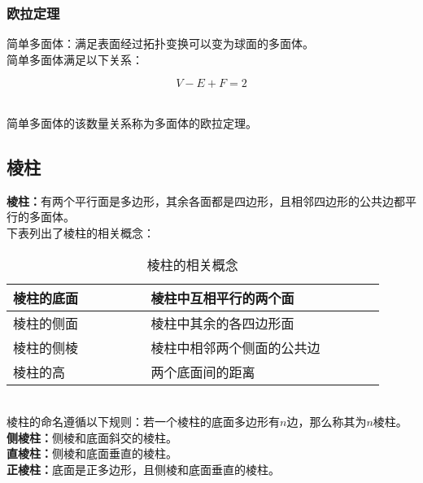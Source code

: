 \documentclass[UTF8]{ctexart}
\begin{document}
\subsubsection{欧拉定理}
    简单多面体：满足表面经过拓扑变换可以变为球面的多面体。\\[3mm]
    简单多面体满足以下关系：
    \begin{large}
        \begin{equation*}
            V-E+F=2
        \end{equation*}
    \end{large}\\
    简单多面体的该数量关系称为多面体的欧拉定理。

\newpage

\subsection{棱柱}
    \textbf{棱柱：}有两个平行面是多边形，其余各面都是四边形，且相邻四边形的公共边都平行的多面体。\\[3mm]
    下表列出了棱柱的相关概念：\vspace{5pt}
    \begin{table}[h]
        \begin{center}
            \begin{tabular}{l|l}
                \hline
                棱柱的底面~~~~~~~~&棱柱中互相平行的两个面~~~~~~~~\\ \hline
                棱柱的侧面~~~~~~~~&棱柱中其余的各四边形面~~~~~~~~\\ \hline
                棱柱的侧棱~~~~~~~~&棱柱中相邻两个侧面的公共边~~~~~~~~\\ \hline
                棱柱的高~~~~~~~~&两个底面间的距离~~~~~~~~\\ \hline
            \end{tabular}
            \caption{棱柱的相关概念}
        \end{center}
    \end{table}\\
    棱柱的命名遵循以下规则：若一个棱柱的底面多边形有$n$边，那么称其为$n$棱柱。\\[3mm]
    \textbf{侧棱柱：}侧棱和底面斜交的棱柱。\\[3mm]
    \textbf{直棱柱：}侧棱和底面垂直的棱柱。\\[3mm]
    \textbf{正棱柱：}底面是正多边形，且侧棱和底面垂直的棱柱。\\
\end{document}
